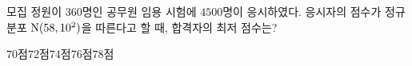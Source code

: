 모집 정원이 $360$명인 공무원 임용 시험에 $4500$명이 응시하였다. 응시자의 점수가 정규분포 $\mathrm{N}(58{,}\mkern3mu\mathopen{}10^2)$을 따른다고 할 때, 합격자의 최저 점수는? 
\begin{choices32}{$70$점}{$72$점}{$74$점}{$76$점}{$78$점}\end{choices32}
